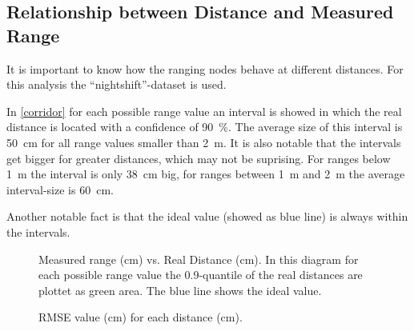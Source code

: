 \subsection{Relationship between Distance and Measured Range}

It is important to know how the ranging nodes behave at different distances.
For this analysis the \enquote{nightshift}-dataset is used.

In \autoref{corridor} for each possible range value an interval is showed in which the real distance is located with a confidence of \SI{90}{\percent}.
The average size of this interval is \SI{50}{cm} for all range values smaller than \SI{2}{m}.
It is also notable that the intervals get bigger for greater distances, which may not be suprising.
For ranges below \SI{1}{m} the interval is only \SI{38}{cm} big, for ranges between \SI{1}{m} and \SI{2}{m} the average interval-size is \SI{60}{cm}.

Another notable fact is that the ideal value (showed as blue line) is always within the intervals.

\begin{figure}[h]
	\centering
	
	\caption[ Measured range vs. Real Distance ]{Measured range (cm) vs. Real Distance (cm). In this diagram for each possible range value the 0.9-quantile of the real distances are plottet as green area. The blue line shows the ideal value.}
	\label{corridor}
\end{figure}

\begin{figure}[h]
	\centering
	
	\caption[ RMSE over distance ]{RMSE value (cm) for each distance (cm).}
	\label{corridor}
\end{figure}



%		
%
%		
%
%		


